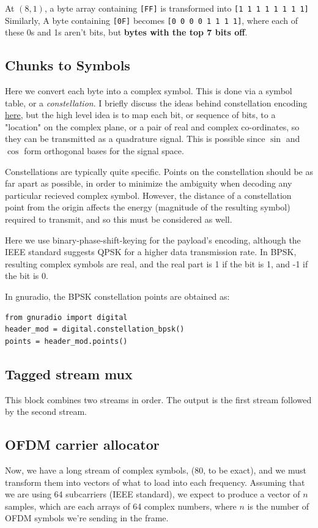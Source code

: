 \documentclass[11pt]{article}
\begin{document}
At \((8, 1)\), a byte array containing \texttt{[FF]} is transformed into \texttt{[1 1
1 1 1 1 1 1]} Similarly, A byte containing \texttt{[0F]} becomes \texttt{[0 0 0 0 1
1 1 1]}, where each of these 0s and 1s aren't bits, but \textbf{bytes with
the top 7 bits off}.

\subsection{Chunks to Symbols}
\label{sec:orga01474b}
Here we convert each byte into a complex symbol. This is done via a
symbol table, or a \emph{constellation}. I briefly discuss the ideas behind
constellation encoding \href{https://notes.esrh.me/phase\_shift\_keying.html}{here}, but the high level idea is to map each
bit, or sequence of bits, to a "location" on the complex plane, or a
pair of real and complex co-ordinates, so they can be transmitted as a
quadrature signal. This is possible since \(\sin\) and \(\cos\) form
orthogonal bases for the signal space.

Constellations are typically quite specific. Points on the
constellation should be as far apart as possible, in order to minimize
the ambiguity when decoding any particular recieved complex
symbol. However, the distance of a constellation point from the origin
affects the energy (magnitude of the resulting symbol) required to
transmit, and so this must be considered as well.

Here we use binary-phase-shift-keying for the payload's encoding,
although the IEEE standard suggests QPSK for a higher data
transmission rate. In BPSK, resulting complex symbols are real, and
the real part is 1 if the bit is 1, and -1 if the bit is 0.

In gnuradio, the BPSK constellation points are obtained as:

\begin{verbatim}
from gnuradio import digital
header_mod = digital.constellation_bpsk()
points = header_mod.points()
\end{verbatim}
\subsection{Tagged stream mux}
\label{sec:orgf7745ff}
This block combines two streams in order. The output is the first
stream followed by the second stream.

\subsection{OFDM carrier allocator}
\label{sec:org1ec00f0}
Now, we have a long stream of complex symbols, (80, to be exact), and
we must transform them into vectors of what to load into each
frequency. Assuming that we are using 64 subcarriers (IEEE standard),
we expect to produce a vector of \(n\) samples, which are each arrays of
64 complex numbers, where \(n\) is the number of OFDM symbols we're
sending in the frame.
\end{document}
